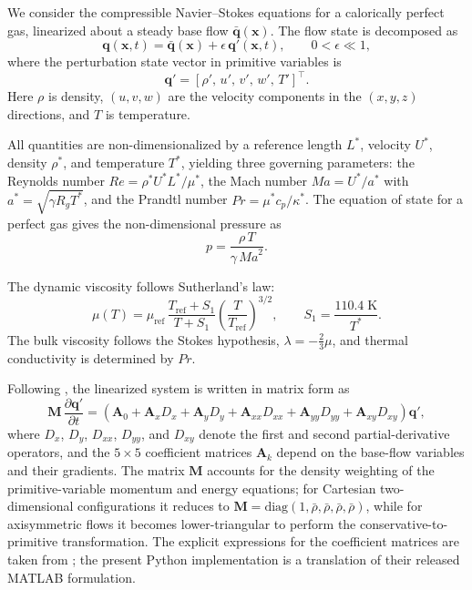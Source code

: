 \documentclass[11pt]{article}
\newcommand{\pp}{\partial}
\newcommand{\Rey}{\mathit{Re}}
\newcommand{\Ma}{\mathit{Ma}}
\renewcommand{\Pr}{\mathit{Pr}}
\newcommand{\bq}{\mathbf{q}}
\newcommand{\bqp}{\mathbf{q}'}
\newcommand{\bqbar}{\bar{\mathbf{q}}}
\newcommand{\bx}{\mathbf{x}}
\newcommand{\bA}{\mathbf{A}}
\newcommand{\bM}{\mathbf{M}}
\begin{document}
We consider the compressible Navier--Stokes equations for a calorically perfect
gas, linearized about a steady base flow $\bqbar(\bx)$. The flow state is
decomposed as
\begin{equation}
  \bq(\bx,t) = \bqbar(\bx) + \epsilon\,\bqp(\bx,t),
  \qquad 0 < \epsilon \ll 1,
\end{equation}
where the perturbation state vector in primitive variables is
\begin{equation}
  \bqp = [\rho',\, u',\, v',\, w',\, T']^\top.
  \label{eq:state_vector}
\end{equation}
Here $\rho$ is density, $(u,v,w)$ are the velocity components in the
$(x,y,z)$ directions, and $T$ is temperature.

All quantities are non-dimensionalized by a reference length $L^*$, velocity
$U^*$, density $\rho^*$, and temperature $T^*$, yielding three governing
parameters: the Reynolds number
$\Rey = \rho^* U^* L^* / \mu^*$, the Mach number
$\Ma = U^* / a^*$ with $a^* = \sqrt{\gamma R_g T^*}$, and the Prandtl number
$\Pr = \mu^* c_p / \kappa^*$. The equation of state for a perfect gas gives the
non-dimensional pressure as
\begin{equation}
  p = \frac{\rho\,T}{\gamma\,\Ma^2}.
  \label{eq:eos}
\end{equation}

The dynamic viscosity follows Sutherland's law:
\begin{equation}
  \mu(T) = \mu_{\mathrm{ref}}\,
  \frac{T_{\mathrm{ref}} + S_1}{T + S_1}
  \left(\frac{T}{T_{\mathrm{ref}}}\right)^{3/2},
  \qquad
  S_1 = \frac{110.4\;\mathrm{K}}{T^*}.
  \label{eq:sutherland}
\end{equation}
The bulk viscosity follows the Stokes hypothesis,
$\lambda = -\tfrac{2}{3}\mu$, and thermal conductivity is determined by
$\Pr$.

Following \citet{martini2024}, the linearized system is written in matrix form
as
\begin{equation}
  \bM\,\frac{\pp\bqp}{\pp t}
  =
  \left(
      \bA_0
    + \bA_x D_x
    + \bA_y D_y
    + \bA_{xx} D_{xx}
    + \bA_{yy} D_{yy}
    + \bA_{xy} D_{xy}
  \right)\bqp,
  \label{eq:lnse_matrix}
\end{equation}
where $D_x$, $D_y$, $D_{xx}$, $D_{yy}$, and $D_{xy}$ denote the first and
second partial-derivative operators, and the $5\times5$ coefficient matrices
$\bA_k$ depend on the base-flow variables and their gradients. The matrix $\bM$
accounts for the density weighting of the primitive-variable momentum and
energy equations; for Cartesian two-dimensional configurations it reduces to
$\bM = \mathrm{diag}(1,\bar{\rho},\bar{\rho},\bar{\rho},\bar{\rho})$, while
for axisymmetric flows it becomes lower-triangular to perform the
conservative-to-primitive transformation. The explicit expressions for the
coefficient matrices are taken from \citet{martini2024}; the present Python
implementation is a translation of their released MATLAB formulation.
\end{document}
